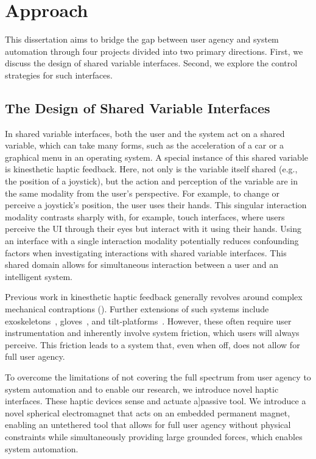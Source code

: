 \section{Approach}
\label{sec:Approach}
This dissertation aims to bridge the gap between user agency and system automation through four projects divided into two primary directions. First, we discuss the design of shared variable interfaces. Second, we explore the control strategies for such interfaces.
\subsection{The Design of Shared Variable Interfaces}

In shared variable interfaces, both the user and the system act on a shared variable, which can take many forms, such as the acceleration of a car or a graphical menu in an operating system. A special instance of this shared variable is kinesthetic haptic feedback. Here, not only is the variable itself shared (e.g., the position of a joystick), but the action and perception of the variable are in the same modality from the user's perspective. For example, to change or perceive a joystick's position, the user uses their hands. This singular interaction modality contrasts sharply with, for example, touch interfaces, where users perceive the UI through their eyes but interact with it using their hands. Using an interface with a single interaction modality potentially reduces confounding factors when investigating interactions with shared variable interfaces. This shared domain allows for simultaneous interaction between a user and an intelligent system.

Previous work in kinesthetic haptic feedback generally revolves around complex mechanical contraptions (\eg \cite{Massie94, Stamper1997, VanDerLinde2002, Araujo2016, zoller2019assessment, Sinclair2019Capstan}). Further extensions of such systems include exoskeletons~\cite{Gu2016, Choi2016}, gloves~\cite{Cybergrasp, hinchet2018dextres}, and tilt-platforms~\cite{Prattichizzo2013, Kim2016}. However, these often require user instrumentation and inherently involve system friction, which users will always perceive. This friction leads to a system that, even when off, does not allow for full user agency.

To overcome the limitations of not covering the full spectrum from user agency to system automation and to enable our research, we introduce novel haptic interfaces. These haptic devices sense and actuate a]passive tool. We introduce a novel spherical electromagnet that acts on an embedded permanent magnet, enabling an untethered tool that allows for full user agency without physical constraints while simultaneously providing large grounded forces, which enables system automation.

